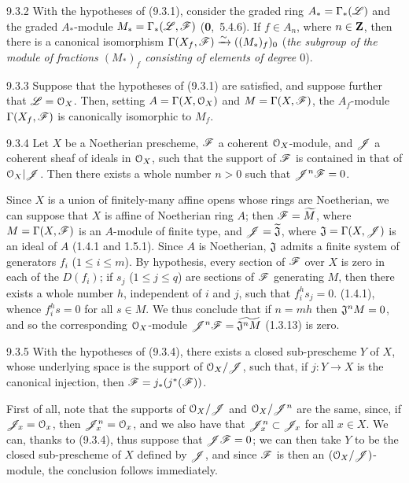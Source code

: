 \documentclass[../main.tex]{subfiles}
\begin{document}
\begin{cx}[Corollary]{9.3.2}
    With the hypotheses of {\normalfont(9.3.1)}, consider the graded ring $A_*=\Gamma_*(\mathscr{L})$ and the graded $A_*$-module $M_*=\Gamma_*(\mathscr{L},\mathscr{F})$ {\normalfont(\textbf{0},~5.4.6)}.
    If $f\in A_n$, where $n\in\mathbf{Z}$, then there is a canonical isomorphism $\Gamma(X_f,\mathscr{F})\xrightarrow{\sim}((M_*)_f)_0$ (\emph{the subgroup of the module of fractions $(M_*)_f$ consisting of elements of degree $0$}).
\end{cx}
\begin{cx}[Corollary]{9.3.3}
    Suppose that the hypotheses of {\normalfont(9.3.1)} are satisfied, and suppose further that $\mathscr{L}=\mathcal{O}_X$.
    Then, setting $A=\Gamma(X,\mathcal{O}_X)$ and $M=\Gamma(X,\mathscr{F})$, the $A_f$-module $\Gamma(X_f,\mathscr{F})$ is canonically isomorphic to $M_f$.
\end{cx}
\begin{cx}[Proposition]{9.3.4}
    Let $X$ be a Noetherian prescheme, $\mathscr{F}$ a coherent $\mathcal{O}_X$-module, and $\mathscr{J}$ a coherent sheaf of ideals in $\mathcal{O}_X$, such that the support of $\mathscr{F}$ is contained in that of $\mathcal{O}_X|\mathscr{J}$.
    Then there exists a whole number $n>0$ such that $\mathscr{J}^n\mathscr{F}=0$.
\end{cx}

Since $X$ is a union of finitely-many affine opens whose rings are Noetherian, we can suppose that $X$ is affine of Noetherian ring $A$; then $\mathscr{F}=\widetilde{M}$, where $M=\Gamma(X,\mathscr{F})$ is an $A$-module of finite type, and $\mathscr{J}=\widetilde{\mathfrak{J}}$, where $\mathfrak{J}=\Gamma(X,\mathscr{J})$ is an ideal of $A$ (1.4.1 and 1.5.1).
Since $A$ is Noetherian, $\mathfrak{J}$ admits a finite system of generators $f_i$ ($1\leqslant i\leqslant m$).
By hypothesis, every section of $\mathscr{F}$ over $X$ is zero in each of the $D(f_i)$; if $s_j$ ($1\leqslant j\leqslant q$) are sections of $\mathscr{F}$ generating $M$, then there exists a whole number $h$, independent of $i$ and $j$, such that $f_i^h s_j=0$. (1.4.1), whence $f_i^h s=0$ for all $s\in M$.
We thus conclude that if $n=mh$ then $\mathfrak{J}^n M=0$, and so the corresponding $\mathcal{O}_X$-module $\mathscr{J}^n\mathscr{F}=\widetilde{\mathfrak{J}^nM}$ (1.3.13) is zero.

\begin{cx}[Corollary]{9.3.5}
    With the hypotheses of {\normalfont(9.3.4)}, there exists a closed sub-prescheme $Y$ of $X$, whose underlying space is the support of $\mathcal{O}_X/\mathscr{J}$, such that, if $j\colon Y\to X$ is the canonical injection, then $\mathscr{F}=j_*(j^*(\mathscr{F}))$.
\end{cx}

First of all, note that the supports of $\mathcal{O}_X/\mathscr{J}$ and $\mathcal{O}_X/\mathscr{J}^n$ are the same, since, if $\mathscr{J}_x=\mathcal{O}_x$, then $\mathscr{J}_x^n=\mathcal{O}_x$, and we also have that $\mathscr{J}_x^n\subset\mathscr{J}_x$ for all $x\in X$.
We can, thanks to (9.3.4), thus suppose that $\mathscr{J}\mathscr{F}=0$; we can then take $Y$ to be the closed sub-prescheme of $X$ defined by $\mathscr{J}$, and since $\mathscr{F}$ is then an $(\mathcal{O}_X/\mathscr{J})$-module, the conclusion follows immediately.
\end{document}

